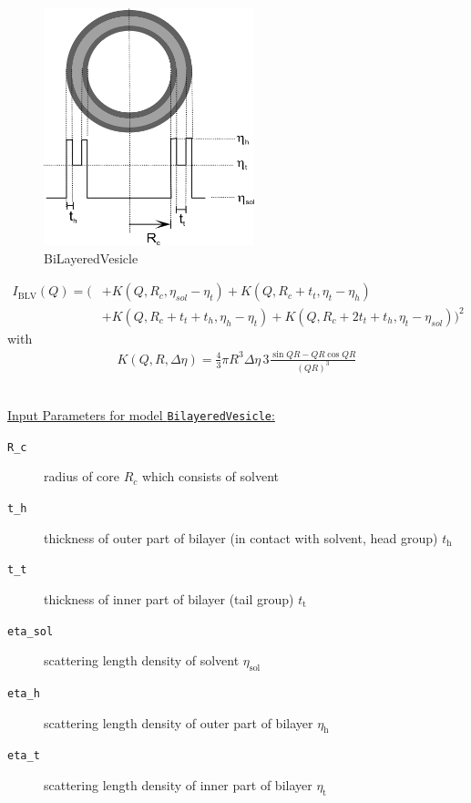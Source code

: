 \begin{figure}[htb]
\begin{center}
\includegraphics[width=0.5441\textwidth]{../images/form_factor/spheres/BiLayeredVesicle.png}
\end{center}
\caption{BiLayeredVesicle} \label{fig:BiLayeredVesicle}
\end{figure}
\begin{align}
I_\text{BLV}(Q) = \bigg( & + K(Q,R_c,\eta_{sol}-\eta_{t})+ K(Q,R_c+t_{t},\eta_{t}-\eta_{h}) \\
&+ K(Q,R_c+t_{t}+t_{h},\eta_{h}-\eta_{t}) +
K(Q,R_c+2t_{t}+t_{h},\eta_{t}-\eta_{sol}) \bigg)^2 \nonumber
\end{align}
with
\begin{align}
 K(Q,R,\Delta\eta) = \frac{4}{3}\pi R^3 \Delta\eta \, 3 \frac{\sin QR - QR \cos QR}{(QR)^3}
\end{align}

\vspace{5mm}
\hspace{1pt}\\
\uline{Input Parameters for model \texttt{BilayeredVesicle}:}\\
\begin{description}
\item[\texttt{R\_c}] radius of core $R_c$ which consists of solvent
\item[\texttt{t\_h}] thickness of outer part of bilayer (in contact with solvent, head group) $t_\text{h}$
\item[\texttt{t\_t}] thickness of inner part of bilayer (tail group) $t_\text{t}$
\item[\texttt{eta\_sol}] scattering length density of solvent $\eta_\text{sol}$
\item[\texttt{eta\_h}] scattering length density of outer part of bilayer $\eta_\text{h}$
\item[\texttt{eta\_t}] scattering length density of inner part of bilayer $\eta_\text{t}$
\end{description}

